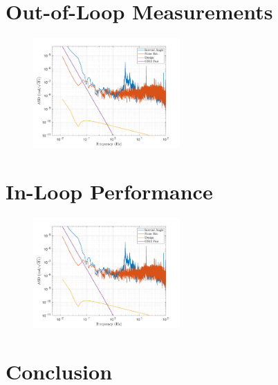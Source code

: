\documentclass[twocolumn]{revtex4-1}
\begin{document}
\section{Out-of-Loop Measurements}



\begin{figure}[!h]
\centering \includegraphics[width=0.5\textwidth]{cBRS_Stanford_InAir_TableLocked.pdf}
\caption{}
\label{outloop} 
\end{figure}

\section{In-Loop Performance}



\begin{figure}[!h]
\centering \includegraphics[width=0.5\textwidth]{cBRS_Stanford_InAir_TableLocked.pdf}
\caption{}
\label{inloop} 
\end{figure}

\section{Conclusion}

 

\end{document}
